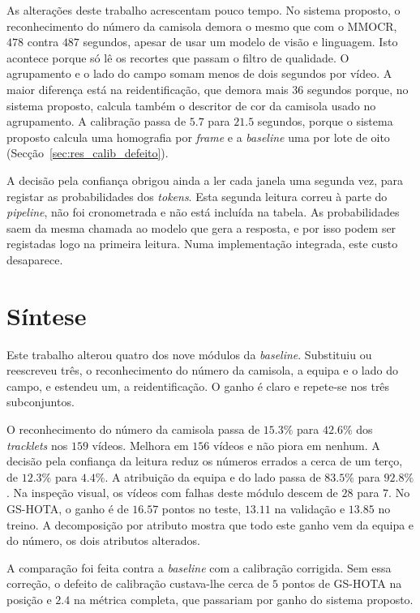 As alterações deste trabalho acrescentam pouco tempo. No sistema proposto, o reconhecimento do número da camisola demora o mesmo que com o MMOCR, $478$ contra $487$ segundos, apesar de usar um modelo de visão e linguagem. Isto acontece porque só lê os recortes que passam o filtro de qualidade. O agrupamento e o lado do campo somam menos de dois segundos por vídeo. A maior diferença está na reidentificação, que demora mais $36$ segundos porque, no sistema proposto, calcula também o descritor de cor da camisola usado no agrupamento. A calibração passa de $5.7$ para $21.5$ segundos, porque o sistema proposto calcula uma homografia por \emph{frame} e a \emph{baseline} uma por lote de oito (Secção~\ref{sec:res_calib_defeito}).

A decisão pela confiança obrigou ainda a ler cada janela uma segunda vez, para registar as probabilidades dos \emph{tokens}. Esta segunda leitura correu à parte do \emph{pipeline}, não foi cronometrada e não está incluída na tabela. As probabilidades saem da mesma chamada ao modelo que gera a resposta, e por isso podem ser registadas logo na primeira leitura. Numa implementação integrada, este custo desaparece.

\section{Síntese}\label{sec:res_sintese}

Este trabalho alterou quatro dos nove módulos da \emph{baseline}. Substituiu ou reescreveu três, o reconhecimento do número da camisola, a equipa e o lado do campo, e estendeu um, a reidentificação. O ganho é claro e repete-se nos três subconjuntos.

O reconhecimento do número da camisola passa de $15.3\%$ para $42.6\%$ dos \emph{tracklets} nos $159$ vídeos. Melhora em $156$ vídeos e não piora em nenhum. A decisão pela confiança da leitura reduz os números errados a cerca de um terço, de $12.3\%$ para $4.4\%$. A atribuição da equipa e do lado passa de $83.5\%$ para $92.8\%$. Na inspeção visual, os vídeos com falhas deste módulo descem de $28$ para $7$. No GS-HOTA, o ganho é de $16.57$ pontos no teste, $13.11$ na validação e $13.85$ no treino. A decomposição por atributo mostra que todo este ganho vem da equipa e do número, os dois atributos alterados.

A comparação foi feita contra a \emph{baseline} com a calibração corrigida. Sem essa correção, o defeito de calibração custava-lhe cerca de $5$ pontos de GS-HOTA na posição e $2.4$ na métrica completa, que passariam por ganho do sistema proposto.

